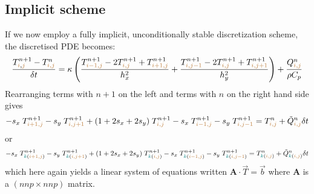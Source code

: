 \subsection{Implicit scheme} 
If we now employ a fully implicit, unconditionally stable discretization 
scheme, the discretised 
PDE becomes:
\begin{equation}
\frac{T_{{\color{brown}i},{\color{brown}j}}^{n+1}-T_{{\color{brown}i,j}}^n}{\delta t}
= \kappa
\left(
\frac{ T_{{\color{brown}i-1,j}}^{n+1}-2T_{{\color{brown}i,j}}^{n+1}+T_{{\color{brown}i+1,j}}^{n+1} }{h_x^2} + 
\frac{ T_{{\color{brown}i,j-1}}^{n+1}-2T_{{\color{brown}i,j}}^{n+1}+T_{{\color{brown}i,j+1}}^{n+1} }{h_y^2}
\right)
+\frac{Q_{{\color{brown}i,j}}^n}{\rho C_p}
\end{equation}
Rearranging terms with $n+1$ on the left and terms with $n$ on the right 
hand side gives
\begin{equation}
-s_x\; T_{{\color{brown}i+1,j}}^{n+1}
-s_y\; T_{{\color{brown}i,j+1}}^{n+1} 
+(1+2s_x+2s_y)\; T_{{\color{brown}i,j}}^{n+1} 
-s_x\;  T_{{\color{brown}i-1,j}}^{n+1} 
-s_y\;  T_{{\color{brown}i,j-1}}^{n+1} 
=
T_{{\color{brown}i,j}}^n
+\tilde{Q}_{{\color{brown}i,j}}^n \delta t
\end{equation}
or
\begin{equation}
-s_x\;           T_{{\color{teal}k}({\color{brown}i+1,j})}^{n+1}
-s_y\;           T_{{\color{teal}k}({\color{brown}i,j+1})}^{n+1} 
+(1+2s_x+2s_y)\; T_{{\color{teal}k}({\color{brown}i,j}  )}^{n+1} 
-s_x\;           T_{{\color{teal}k}({\color{brown}i-1,j})}^{n+1} 
-s_y\;           T_{{\color{teal}k}({\color{brown}i,j-1})}^{n+1} 
=
T_{{\color{teal}k}({\color{brown}i,j})}^n
+\tilde{Q}_{{\color{teal}k}({\color{brown}i,j})}^n \delta t
\end{equation}
which here again yields a linear system of equations written 
${\bm A}\cdot {\vec T} = {\vec b}$
where ${\bm A}$ is a $(nnp \times nnp)$ matrix.

\begin{minipage}[t]{\textwidth}
\begin{center}

\end{center}
\end{minipage}

